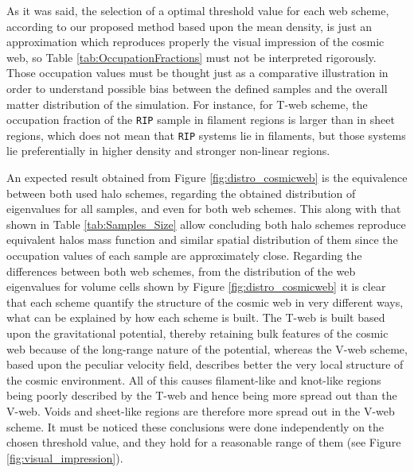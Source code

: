 \documentclass[usenatbib]{latex/mn2e}
\begin{document}
As it was said, the selection of a optimal threshold value for each web 
scheme, according to our proposed method based upon the mean density, is 
just an approximation which reproduces properly the visual impression of 
the cosmic web, so Table \ref{tab:OccupationFractions} must not be 
interpreted rigorously. Those occupation values must be thought just as a 
comparative illustration in order to understand possible bias between the 
defined samples and the overall matter distribution of the simulation. For 
instance, for T-web scheme, the occupation fraction of the \texttt{RIP} 
sample in filament regions is larger than in sheet regions, which does not 
mean that \texttt{RIP} systems lie in filaments, but those systems lie 
preferentially in higher density and stronger non-linear regions.



An expected result obtained from Figure \ref{fig:distro_cosmicweb} is 
the equivalence between both used halo schemes, regarding the obtained 
distribution of eigenvalues for all samples, and even for both web schemes.
This along with that shown in Table \ref{tab:Samples_Size} allow 
concluding both halo schemes reproduce equivalent halos mass function and 
similar spatial distribution of them since the occupation values of each 
sample are approximately close. 
Regarding the differences between both web schemes, from the distribution 
of the web eigenvalues for volume cells shown by Figure 
\ref{fig:distro_cosmicweb} it is clear that each scheme quantify the 
structure of the cosmic web in very different ways, what can be explained 
by how each scheme is built. The T-web is built based upon the 
gravitational potential, thereby retaining bulk features of the cosmic web 
because of the long-range nature of the potential, whereas the V-web 
scheme, based upon the peculiar velocity field, describes better the very 
local structure of the cosmic environment. All of this causes filament-like
and knot-like regions being poorly described by the T-web and hence being 
more spread out than the V-web. Voids and sheet-like regions are therefore 
more spread out in the V-web scheme. It must be noticed these conclusions 
were done independently on the chosen threshold value, and they hold for a 
reasonable range of them (see Figure \ref{fig:visual_impression}).
\end{document}
